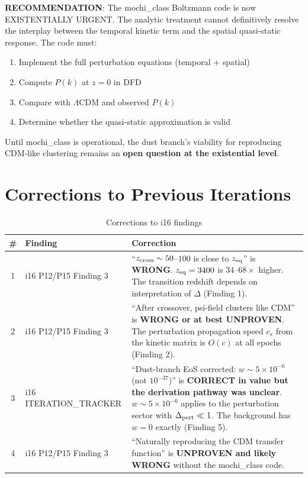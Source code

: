 \documentclass[11pt]{article}
\newcommand{\ee}[1]{\times 10^{#1}}
\newcommand{\LCDM}{$\Lambda$CDM}
\begin{document}
\begin{tcolorbox}[colback=red!10!white, colframe=red!70!black,
  title=\textbf{EXISTENTIAL ASSESSMENT}]
\textbf{RECOMMENDATION}: The mochi\_class Boltzmann code is now
EXISTENTIALLY URGENT. The analytic treatment cannot definitively
resolve the interplay between the temporal kinetic term and the
spatial quasi-static response. The code must:
\begin{enumerate}[nosep]
\item Implement the full perturbation equations (temporal + spatial)
\item Compute $P(k)$ at $z = 0$ in DFD
\item Compare with \LCDM{} and observed $P(k)$
\item Determine whether the quasi-static approximation is valid
\end{enumerate}

Until mochi\_class is operational, the dust branch's viability for
reproducing CDM-like clustering remains an \textbf{open question
at the existential level}.
\end{tcolorbox}


\section*{Corrections to Previous Iterations}

\begin{table}[H]
\centering
\caption{Corrections to i16 findings}
\begin{tabular}{clp{8cm}}
\toprule
\# & Finding & Correction \\
\midrule
1 & i16 P12/P15 Finding 3 & ``$z_{\rm cross} \sim 50$--$100$ is
  close to $z_{\rm eq}$'' is \textbf{WRONG}. $z_{\rm eq} = 3400$
  is $34$--$68\times$ higher. The transition redshift depends on
  interpretation of $\Delta$ (Finding 1). \\
2 & i16 P12/P15 Finding 3 & ``After crossover, psi-field clusters
  like CDM'' is \textbf{WRONG or at best UNPROVEN}. The perturbation
  propagation speed $c_s$ from the kinetic matrix is $O(c)$ at all
  epochs (Finding 2). \\
3 & i16 ITERATION\_TRACKER & ``Dust-branch EoS corrected: $w \sim 5\ee{-6}$
  (not $10^{-37}$)'' is \textbf{CORRECT in value but the derivation
  pathway was unclear}. $w \sim 5\ee{-6}$ applies to the perturbation
  sector with $\Delta_{\rm pert} \ll 1$. The background has $w = 0$
  exactly (Finding 5). \\
4 & i16 P12/P15 Finding 3 & ``Naturally reproducing the CDM transfer
  function'' is \textbf{UNPROVEN and likely WRONG} without the
  mochi\_class code. \\
\bottomrule
\end{tabular}
\end{table}
\end{document}
